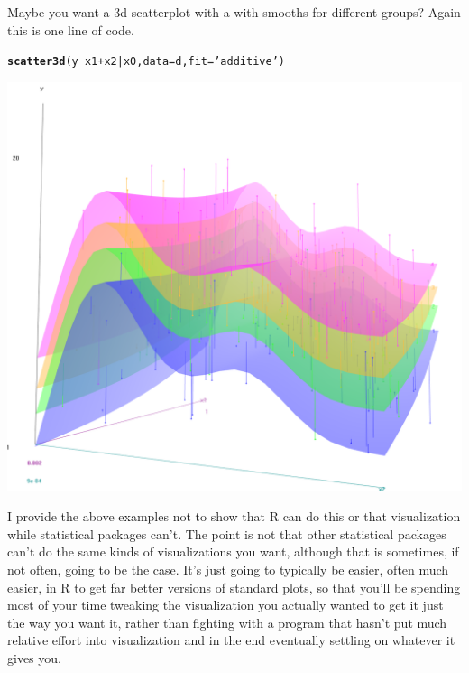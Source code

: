 \documentclass[english,nohyper,titlepage]{tufte-handout}\usepackage[]{graphicx}\usepackage[]{color}
\makeatletter
\newcommand{\hlstr}[1]{\textcolor[rgb]{0.192,0.494,0.8}{#1}}%
\newcommand{\hlopt}[1]{\textcolor[rgb]{0,0,0}{#1}}%
\newcommand{\hlstd}[1]{\textcolor[rgb]{0.345,0.345,0.345}{#1}}%
\newcommand{\hlkwc}[1]{\textcolor[rgb]{0.333,0.667,0.333}{#1}}%
\newcommand{\hlkwd}[1]{\textcolor[rgb]{0.737,0.353,0.396}{\textbf{#1}}}%
\newenvironment{kframe}{%
 \def\at@end@of@kframe{}%
 \ifinner\ifhmode%
  \def\at@end@of@kframe{\end{minipage}}%
  \begin{minipage}{\columnwidth}%
 \fi\fi%
 \def\FrameCommand##1{\hskip\@totalleftmargin \hskip-\fboxsep
 \colorbox{shadecolor}{##1}\hskip-\fboxsep
     \hskip-\linewidth \hskip-\@totalleftmargin \hskip\columnwidth}%
 \MakeFramed {\advance\hsize-\width
   \@totalleftmargin\z@ \linewidth\hsize
   \@setminipage}}%
 {\par\unskip\endMakeFramed%
 \at@end@of@kframe}
\newenvironment{knitrout}{}{} %
\makeatother
\begin{document}
\noindent Maybe you want a 3d scatterplot with a with smooths for different groups?  Again this is one line of code.

\begin{knitrout}\footnotesize
{}\color{fgcolor}\begin{kframe}
\begin{alltt}
\hlkwd{scatter3d}\hlstd{(y} \hlopt{~} \hlstd{x1} \hlopt{+} \hlstd{x2} \hlopt{|} \hlstd{x0,} \hlkwc{data}\hlstd{=d,} \hlkwc{fit}\hlstd{=}\hlstr{'additive'}\hlstd{)}
\end{alltt}
\end{kframe}
\end{knitrout}
\includegraphics[scale=.25]{gam3d}

I provide the above examples not to show that R can do this or that visualization while statistical packages can't.  The point is not that other statistical packages can't do the same kinds of visualizations you want, although that is sometimes, if not often, going to be the case.  It's just going to typically be easier, often much easier, in R to get far better versions of standard plots, so that you'll be spending most of your time tweaking the visualization you actually wanted to get it just the way you want it, rather than fighting with a program that hasn't put much relative effort into visualization and in the end eventually settling on whatever it gives you.
\end{document}
